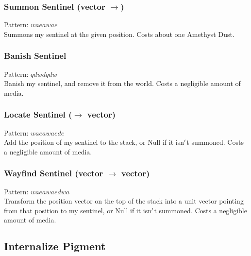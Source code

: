 \documentclass[12pt]{article}
\begin{document}
  \label{sec: patterns/spells/sentinels@hexcasting:sentinel/create}
\subsubsection*{Summon Sentinel (vector $\rightarrow$)}

    Pattern: $waeawae$\\
      Summons my sentinel at the given position. Costs about one Amethyst Dust.\\


  \label{sec: patterns/spells/sentinels@hexcasting:sentinel/destroy}
\subsubsection*{Banish Sentinel}

    Pattern: $qdwdqdw$\\
      Banish my sentinel, and remove it from the world. Costs a negligible amount of media.\\


  \label{sec: patterns/spells/sentinels@hexcasting:sentinel/get_pos}
\subsubsection*{Locate Sentinel ($\rightarrow$ vector)}

    Pattern: $waeawaede$\\
      Add the position of my sentinel to the stack, or Null if it isn$\rq$t summoned. Costs a negligible amount of media.\\


  \label{sec: patterns/spells/sentinels@hexcasting:sentinel/wayfind}
\subsubsection*{Wayfind Sentinel (vector $\rightarrow$ vector)}

    Pattern: $waeawaedwa$\\
      Transform the position vector on the top of the stack into a unit vector pointing from that position to my sentinel, or Null if it isn$\rq$t summoned. Costs a negligible amount of media.\\

\newpage

\label{sec:patterns/spells/colorize}
\subsection*{Internalize Pigment}
\end{document}
